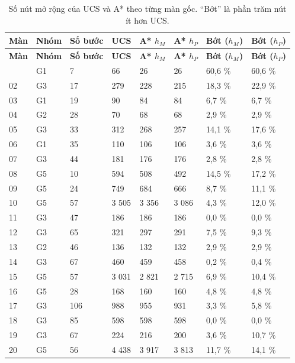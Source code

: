 \begin{longtable}[]{@{}llllllll@{}}
\caption{ Số nút mở rộng của UCS và A* theo từng màn gốc. ``Bớt'' là phần trăm nút ít hơn UCS.}\tabularnewline
\toprule\noalign{}
\rowcolor{tablehead}\textbf{Màn} & \textbf{Nhóm} & \textbf{Số bước} & \textbf{UCS} & \textbf{A* \(h_M\)} & \textbf{A* \(h_P\)} & \textbf{Bớt (\(h_M\))} & \textbf{Bớt (\(h_P\))} \\
\midrule\noalign{}
\endfirsthead
\toprule\noalign{}
\rowcolor{tablehead}\textbf{Màn} & \textbf{Nhóm} & \textbf{Số bước} & \textbf{UCS} & \textbf{A* \(h_M\)} & \textbf{A* \(h_P\)} & \textbf{Bớt (\(h_M\))} & \textbf{Bớt (\(h_P\))} \\
\midrule\noalign{}
\endhead
\bottomrule\noalign{}
\endlastfoot
01 & G1 & 7 & 66 & 26 & 26 & 60,6 \% & 60,6 \% \\
02 & G3 & 17 & 279 & 228 & 215 & 18,3 \% & 22,9 \% \\
03 & G1 & 19 & 90 & 84 & 84 & 6,7 \% & 6,7 \% \\
04 & G2 & 28 & 70 & 68 & 68 & 2,9 \% & 2,9 \% \\
05 & G3 & 33 & 312 & 268 & 257 & 14,1 \% & 17,6 \% \\
06 & G1 & 35 & 110 & 106 & 106 & 3,6 \% & 3,6 \% \\
07 & G3 & 44 & 181 & 176 & 176 & 2,8 \% & 2,8 \% \\
08 & G5 & 10 & 594 & 508 & 492 & 14,5 \% & 17,2 \% \\
09 & G5 & 24 & 749 & 684 & 666 & 8,7 \% & 11,1 \% \\
10 & G5 & 57 & 3 505 & 3 356 & 3 086 & 4,3 \% & 12,0 \% \\
11 & G3 & 47 & 186 & 186 & 186 & 0,0 \% & 0,0 \% \\
12 & G3 & 65 & 321 & 297 & 291 & 7,5 \% & 9,3 \% \\
13 & G2 & 46 & 136 & 132 & 132 & 2,9 \% & 2,9 \% \\
14 & G3 & 67 & 460 & 459 & 458 & 0,2 \% & 0,4 \% \\
15 & G5 & 57 & 3 031 & 2 821 & 2 715 & 6,9 \% & 10,4 \% \\
16 & G5 & 28 & 168 & 160 & 160 & 4,8 \% & 4,8 \% \\
17 & G3 & 106 & 988 & 955 & 931 & 3,3 \% & 5,8 \% \\
18 & G3 & 85 & 598 & 598 & 598 & 0,0 \% & 0,0 \% \\
19 & G3 & 67 & 224 & 216 & 200 & 3,6 \% & 10,7 \% \\
20 & G5 & 56 & 4 438 & 3 917 & 3 813 & 11,7 \% & 14,1 \% \\

\end{longtable}

